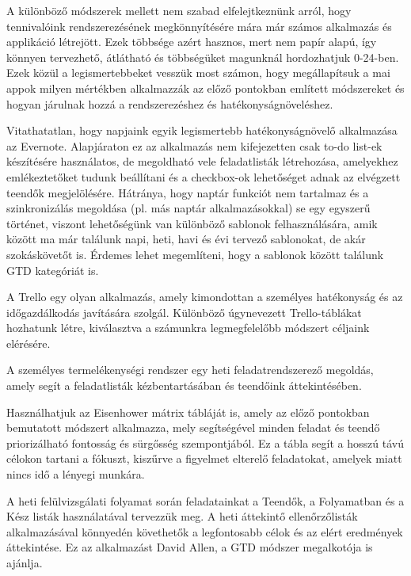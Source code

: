 
A különböző módszerek mellett nem szabad elfelejtkeznünk arról, hogy tennivalóink rendszerezésének megkönnyítésére mára már számos alkalmazás és applikáció létrejött. Ezek többsége azért hasznos, mert nem papír alapú, így könnyen tervezhető, átlátható és többségüket magunknál hordozhatjuk 0-24-ben. Ezek közül a legismertebbeket vesszük most számon, hogy megállapítsuk a mai appok milyen mértékben alkalmazzák az előző pontokban említett módszereket és hogyan járulnak hozzá a rendszerezéshez és hatékonyságnöveléshez.


Vitathatatlan, hogy napjaink egyik legismertebb hatékonyságnövelő alkalmazása az Evernote. Alapjáraton ez az alkalmazás nem kifejezetten csak to-do list-ek készítésére használatos, de megoldható vele feladatlisták létrehozása, amelyekhez emlékeztetőket tudunk beállítani és a checkbox-ok lehetőséget adnak az elvégzett teendők megjelölésére. Hátránya, hogy naptár funkciót nem tartalmaz és a szinkronizálás megoldása (pl. más naptár alkalmazásokkal) se egy egyszerű történet, viszont lehetőségünk van különböző sablonok felhasználására, amik között ma már találunk napi, heti, havi és évi tervező sablonokat, de akár szokáskövetőt is. Érdemes lehet megemlíteni, hogy a sablonok között találunk GTD kategóriát is.


A Trello egy olyan alkalmazás, amely kimondottan a személyes hatékonyság és az időgazdálkodás javítására szolgál. Különböző úgynevezett Trello-táblákat hozhatunk létre, kiválasztva a számunkra legmegfelelőbb módszert céljaink elérésére.

A személyes termelékenységi rendszer egy heti feladatrendszerező megoldás, amely segít a feladatlisták kézbentartásában és teendőink áttekintésében.

Használhatjuk az Eisenhower mátrix tábláját is, amely az előző pontokban bemutatott módszert alkalmazza, mely segítségével minden feladat és teendő priorizálható fontosság és sürgősség szempontjából. Ez a tábla segít a hosszú távú célokon tartani a fókuszt, kiszűrve a figyelmet elterelő feladatokat, amelyek miatt nincs idő a lényegi munkára.

A heti felülvizsgálati folyamat során feladatainkat a Teendők, a Folyamatban és a Kész listák használatával tervezzük meg. A heti áttekintő ellenőrzőlisták alkalmazásával könnyedén követhetők a legfontosabb célok és az elért eredmények áttekintése. Ez az alkalmazást David Allen, a GTD módszer megalkotója is ajánlja.

